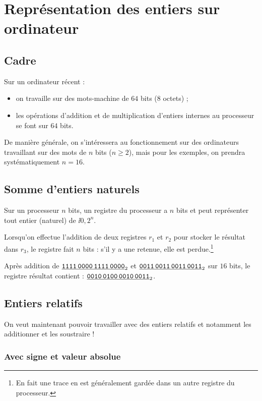 \section{Représentation des entiers sur ordinateur}
\subsection{Cadre}
Sur un ordinateur récent :
\begin{itemize}
\item[\textbullet] on travaille sur des mots-machine de $64$ bits ($8$ octets) ;
\item[\textbullet] les opérations d'addition et de multiplication d'entiers internes au
  processeur se font sur $64$ bits.
\end{itemize}

De manière générale, on s'intéressera au fonctionnement sur des
ordinateurs travaillant sur des mots de $n$ bits ($n\geq 2$), mais pour les
exemples, on prendra systématiquement $n=16$.

\subsection{Somme d'entiers naturels}
\sloppy

Sur un processeur $n$ bits, un registre du processeur a $n$ bits et peut
  représenter tout entier (naturel) de $\ii{0,2^{n}}$.

 Lorsqu'on effectue l'addition de deux registres $r_{1}$ et
  $r_{2}$ pour stocker le résultat dans $r_{3}$, le registre fait $n$
  bits : s'il y a une retenue, elle est perdue.\footnote{En fait une
    trace en est généralement gardée dans un autre registre du
    processeur.}

\begin{exemple}
  Après addition de $\underline{\text{\texttt{1111\,0000\,1111\,0000}}}_{2}$ et
  $\underline{\text{\texttt{0011\,0011\,0011\,0011}}}_{2}$ sur $16$ bits, le registre résultat contient :
  $\underline{\text{\texttt{0010\,0100\,0010\,0011}}}_{2}$.
\end{exemple}
   
\subsection{Entiers relatifs}

On veut maintenant pouvoir travailler avec des entiers relatifs et notamment les additionner et les soustraire !

\subsubsection{Avec signe et valeur absolue}

